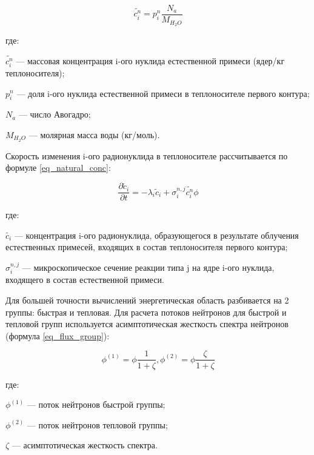 \begin{equation}
    \label{eq_natural_mix}
    \widetilde{c_{i}^{n}} = p_{i}^{n} \frac{N_{a}}{M_{H_{2}O}}
\end{equation}

где:
\begin{description}
    \item $\widetilde{c_{i}^{n}}$ --- массовая концентрация i-ого нуклида естественной примеси (ядер/кг теплоносителя);
    \item $p_{i}^{n}$ --- доля i-ого нуклида естественной примеси в теплоносителе первого контура;
    \item $N_{a}$ --- число Авогадро;
    \item $M_{H_{2}O}$ --- молярная масса воды (кг/моль).
\end{description}

Скорость изменения i-ого радионуклида в теплоносителе рассчитывается по формуле \ref{eq_natural_conc}:

\begin{equation}
    \label{eq_natural_conc}
    \frac{\partial \widetilde{c}_{i}}{\partial t} = -\lambda_{i}\widetilde{c}_{i} + \sigma_{i}^{n,j} \widetilde{c_{i}^{n}}
        \phi 
\end{equation}

где:
\begin{description}
    \item $\widetilde{c_{i}}$ --- концентрация i-ого радионуклида, образующегося в результате облучения естественных 
        примесей, входящих в состав теплоносителя первого контура;
    \item $\sigma_{i}^{n,j}$ --- микроскопическое сечение реакции типа j на ядре i-ого нуклида, входящего в состав 
        естественной примеси.
\end{description}

Для большей точности вычислений энергетическая область разбивается на 2 группы: быстрая и тепловая. Для расчета потоков 
нейтронов для быстрой и тепловой групп используется асимптотическая жесткость спектра нейтронов 
(формула \ref{eq_flux_group}):

\begin{equation}
    \label{eq_flux_group}
    \phi^{(1)} = \phi \frac{1}{1 + \zeta}, \phi^{(2)} = \phi \frac{\zeta}{1 + \zeta}
\end{equation}

где:
\begin{description}
    \item $\phi^{(1)}$ --- поток нейтронов быстрой группы;
    \item $\phi^{(2)}$ --- поток нейтронов тепловой группы;
    \item $\zeta$ --- асимптотическая жесткость спектра.
\end{description}

